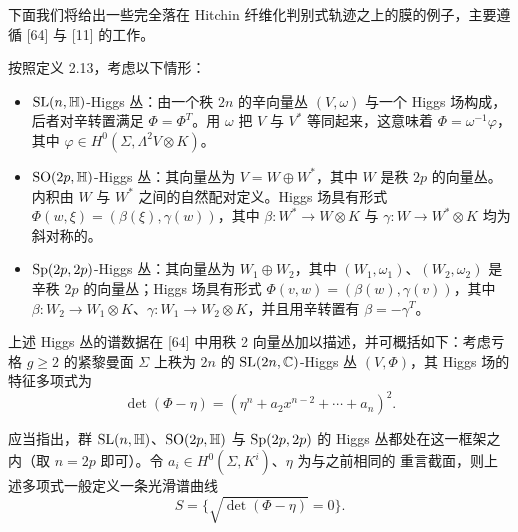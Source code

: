 下面我们将给出一些完全落在 Hitchin 纤维化判别式轨迹之上的膜的例子，主要遵循 [64] 与 [11] 的工作。

 按照定义 2.13，考虑以下情形：

\begin{itemize}[leftmargin=1.4em,itemsep=1pt,topsep=1pt]
\item $\mathrm{SL}(n,\mathbb{H})$-Higgs 丛：由一个秩 $2n$ 的辛向量丛 $(V,\omega)$ 与一个 Higgs 场构成，后者对辛转置满足 $\Phi = \Phi^T$。用 $\omega$ 把 $V$ 与 $V^*$ 等同起来，这意味着 $\Phi = \omega^{-1}\varphi$，其中 $\varphi \in H^0(\Sigma, \Lambda^2V\otimes K)$。

\item $\mathrm{SO}(2p,\mathbb{H})$-Higgs 丛：其向量丛为 $V = W\oplus W^*$，其中 $W$ 是秩 $2p$ 的向量丛。内积由 $W$ 与 $W^*$ 之间的自然配对定义。Higgs 场具有形式 $\Phi(w,\xi) = (\beta(\xi),\gamma(w))$，其中 $\beta : W^*\to W\otimes K$ 与 $\gamma : W\to W^*\otimes K$ 均为斜对称的。

\item $\mathrm{Sp}(2p,2p)$-Higgs 丛：其向量丛为 $W_1\oplus W_2$，其中 $(W_1,\omega_1)$、$(W_2,\omega_2)$ 是辛秩 $2p$ 的向量丛；Higgs 场具有形式 $\Phi(v,w) = (\beta(w),\gamma(v))$，其中 $\beta : W_2\to W_1\otimes K$、$\gamma : W_1\to W_2\otimes K$，并且用辛转置有 $\beta = -\gamma^T$。
\end{itemize}

上述 Higgs 丛的谱数据在 [64] 中用秩 2 向量丛加以描述，并可概括如下：考虑亏格 $g \geqslant 2$ 的紧黎曼面 $\Sigma$ 上秩为 $2n$ 的 $\mathrm{SL}(2n,\mathbb{C})$-Higgs 丛 $(V,\Phi)$，其 Higgs 场的特征多项式为
\begin{equation}
    \det(\Phi-\eta) = (\eta^n + a_2x^{n-2} + \cdots + a_n)^2. \tag{4.10}
\end{equation}

应当指出，群 $\mathrm{SL}(n,\mathbb{H})$、$\mathrm{SO}(2p,\mathbb{H})$ 与 $\mathrm{Sp}(2p,2p)$ 的 Higgs 丛都处在这一框架之内（取 $n = 2p$ 即可）。令 $a_i \in H^0(\Sigma, K^i)$、$\eta$ 为与之前相同的 重言截面，则上述多项式一般定义一条光滑谱曲线
\begin{equation}
    S = \{\sqrt{\det(\Phi-\eta)} = 0\}. \tag{4.11}
\end{equation}

